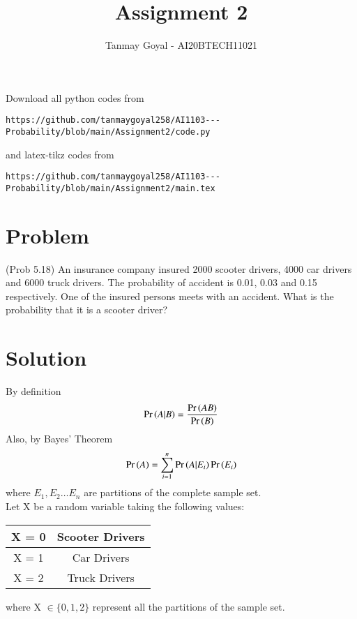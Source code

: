 \documentclass[journal,12pt,twocolumn]{IEEEtran}
\begin{document}
\def\putbox#1#2#3{\makebox[0in][l]{\makebox[#1][l]{}\raisebox{\baselineskip}[0in][0in]{\raisebox{#2}[0in][0in]{#3}}}}
     \def\rightbox#1{\makebox[0in][r]{#1}}
     \def\centbox#1{\makebox[0in]{#1}}
     \def\topbox#1{\raisebox{-\baselineskip}[0in][0in]{#1}}
     \def\midbox#1{\raisebox{-0.5\baselineskip}[0in][0in]{#1}}
\vspace{3cm}
\title{Assignment 2}
\author{Tanmay Goyal - AI20BTECH11021}
\maketitle
\newpage
\bigskip
\renewcommand{\thefigure}{\theenumi}
\renewcommand{\thetable}{\theenumi}
Download all python codes from 
\begin{lstlisting}
https://github.com/tanmaygoyal258/AI1103---Probability/blob/main/Assignment2/code.py
\end{lstlisting}
%
and latex-tikz codes from 
%
\begin{lstlisting}
https://github.com/tanmaygoyal258/AI1103---Probability/blob/main/Assignment2/main.tex
\end{lstlisting}
\section{Problem}
(Prob 5.18) An insurance company insured 2000 scooter drivers, 4000 car drivers and 6000 truck drivers. The probability of accident is 0.01, 0.03 and 0.15 respectively. One of the insured persons meets with an accident. What is the probability that it is a scooter driver?\\

\section{Solution}
By definition
\begin{align}
\Pr\left(A|B\right) = \frac{\Pr\left(AB\right)}{\Pr\left(B\right)} \label{1}
\end{align}
Also, by Bayes' Theorem
\begin{align}
\Pr\left(A\right) = \sum_{i=1}^n \Pr\left(A|E_i\right)\Pr\left(E_i\right)\label{2}
\end{align}
where $E_1 , E_2 \ldots E_n$  are partitions of the complete sample set.\\

Let X be a random variable taking the following values:
\begin{center}
\begin{tabular}{ |c|c| } 
 \hline
 X = 0 & Scooter Drivers\\
 \hline
 X = 1 & Car Drivers\\
 \hline
X = 2 & Truck Drivers\\
 \hline
\end{tabular}
\end{center}
where X $\in \{0, 1, 2\}$ represent all the partitions of the sample set.
\par
\end{document}
